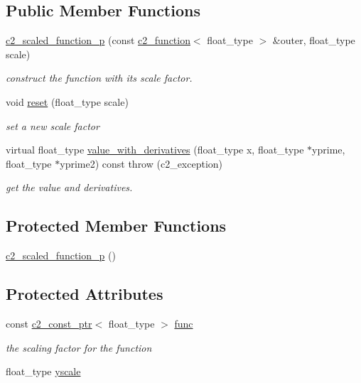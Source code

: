 \subsection*{Public Member Functions}
\begin{DoxyCompactItemize}
\item 
\hyperlink{classc2__scaled__function__p_a50fe165a75a9fb3597a227b8f028bebb}{c2\+\_\+scaled\+\_\+function\+\_\+p} (const \hyperlink{classc2__function}{c2\+\_\+function}$<$ float\+\_\+type $>$ \&outer, float\+\_\+type scale)
\begin{DoxyCompactList}\small\item\em construct the function with its scale factor. \end{DoxyCompactList}\item 
void \hyperlink{classc2__scaled__function__p_ab6a2af982a51bc321609a8cc91c7ff42}{reset} (float\+\_\+type scale)
\begin{DoxyCompactList}\small\item\em set a new scale factor \end{DoxyCompactList}\item 
virtual float\+\_\+type \hyperlink{classc2__scaled__function__p_a29f90a45574f413a18349e220287fb5d}{value\+\_\+with\+\_\+derivatives} (float\+\_\+type x, float\+\_\+type $\ast$yprime, float\+\_\+type $\ast$yprime2) const   throw (c2\+\_\+exception)
\begin{DoxyCompactList}\small\item\em get the value and derivatives. \end{DoxyCompactList}\end{DoxyCompactItemize}
\subsection*{Protected Member Functions}
\begin{DoxyCompactItemize}
\item 
\hyperlink{classc2__scaled__function__p_a520caf02297faba6cec0f17c6bbd27d6}{c2\+\_\+scaled\+\_\+function\+\_\+p} ()
\end{DoxyCompactItemize}
\subsection*{Protected Attributes}
\begin{DoxyCompactItemize}
\item 
const \hyperlink{classc2__const__ptr}{c2\+\_\+const\+\_\+ptr}$<$ float\+\_\+type $>$ \hyperlink{classc2__scaled__function__p_a4ee175f7c60c6967c44418062b93cbbb}{func}
\begin{DoxyCompactList}\small\item\em the scaling factor for the function \end{DoxyCompactList}\item 
float\+\_\+type \hyperlink{classc2__scaled__function__p_a4ea4ca9743bd3783752a9ee5de49ef0f}{yscale}
\end{DoxyCompactItemize}


